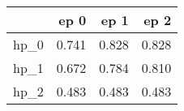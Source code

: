 \begin{tabular}{lrrr}
\toprule
{} &   ep 0 &   ep 1 &   ep 2 \\
\midrule
hp\_0 &  0.741 &  0.828 &  0.828 \\
hp\_1 &  0.672 &  0.784 &  0.810 \\
hp\_2 &  0.483 &  0.483 &  0.483 \\
\bottomrule
\end{tabular}
